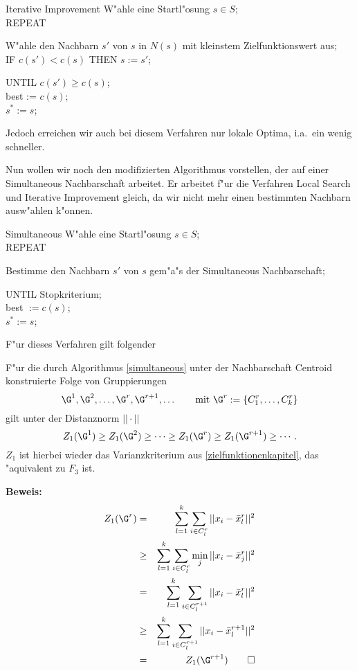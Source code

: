 \begin{algorithm}{Iterative Improvement}
\label{iterativeimprovement}
W"ahle eine Startl"osung $s \in S$;\\
{REPEAT}
\begin{Block}
	W"ahle den Nachbarn $s'$ von $s$ in $N(s)$ mit kleinstem 
	Zielfunktionswert aus;\\
	{IF} $c(s') < c(s)$ {THEN} $s := s'$;
\end{Block}
{UNTIL} $c(s') \geq c(s)$;\\
best := $c(s)$;\\
$s^* := s$;
\end{algorithm}

Jedoch erreichen wir auch bei diesem Verfahren nur lokale Optima,
i.a.\ ein wenig schneller. 

Nun wollen wir noch den modifizierten Algorithmus 
vorstellen, der auf einer Simultaneous Nachbarschaft arbeitet.
Er arbeitet f"ur die Verfahren Local Search und Iterative Improvement
gleich, da wir nicht mehr einen bestimmten Nachbarn ausw"ahlen k"onnen.

\begin{algorithm}{Simultaneous}
\label{simultaneous}
W"ahle eine Startl"osung $s \in S$;\\
REPEAT
\begin{Block}
	Bestimme den Nachbarn $s'$ von $s$ gem"a"s der
	Simultaneous Nachbarschaft;
\end{Block}
UNTIL Stopkriterium;\\
best $ := c(s)$;\\
$s^\ast := s$;
\end{algorithm}

F"ur dieses Verfahren gilt folgender

\begin{satz}
F"ur die durch Algorithmus \ref{simultaneous} unter der Nachbarschaft Centroid
konstruierte Folge von Gruppierungen
\[ \G^1, \G^2,\dots,\G^r,\G^{r+1},\dots\qquad \mbox{mit } \G^r := \{
	C_1^r,\dots,C_k^r\} \]
gilt unter der Distanznorm $||\cdot||$
\[ Z_1(\G^1) \geq Z_1(\G^2) \geq \cdots \geq Z_1(\G^r) \geq Z_1(\G^{r+1})
	\geq  \cdots . \]
$Z_1$ ist hierbei wieder das Varianzkriterium aus \ref{zielfunktionenkapitel},
das "aquivalent zu $F_3$ ist.
\end{satz}

{\bf Beweis:}
\vspace{-3mm}
\begin{eqnarray*}
Z_1(\G^r) & = & 
			 \sum_{l=1}^k \sum_{i \in C_l^r} || x_i - \bar x _l^r ||^2\\
	& \geq & \sum_{l=1}^k \sum_{i \in C_l^r} \min_j || x_i - \bar x _j^r ||^2\\
	& =    & \sum_{l=1}^k \sum_{i \in C_l^{r+1}} || x_i - \bar x _l^r ||^2\\
	& \geq & \sum_{l=1}^k \sum_{i \in C_l^{r+1}} || x_i - \bar x _l^{r+1} ||^2\\
	& =    & Z_1(\G^{r+1})\qquad\Box
\end{eqnarray*}
\vspace{5mm}

